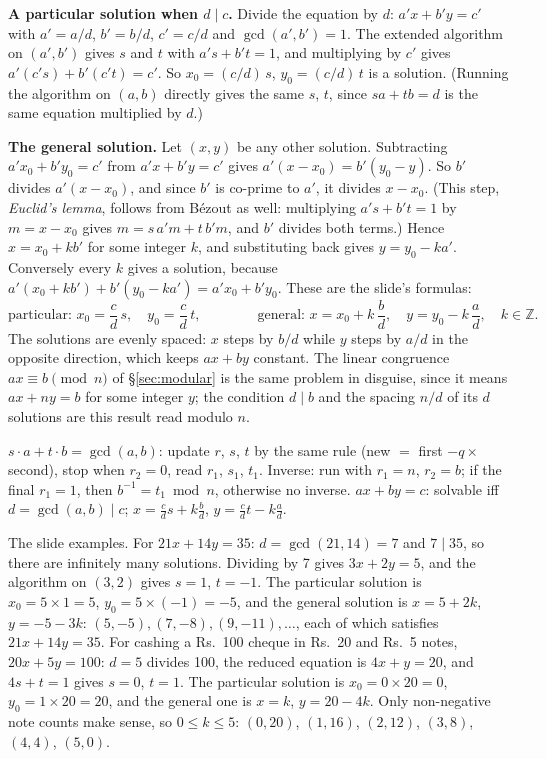 \textbf{A particular solution when $d \mid c$.} Divide the equation by $d$: $a'x + b'y = c'$ with $a' = a/d$, $b' = b/d$, $c' = c/d$ and $\gcd(a', b') = 1$. The extended algorithm on $(a', b')$ gives $s$ and $t$ with $a's + b't = 1$, and multiplying by $c'$ gives $a'(c's) + b'(c't) = c'$. So $x_0 = (c/d)\,s$, $y_0 = (c/d)\,t$ is a solution. (Running the algorithm on $(a, b)$ directly gives the same $s$, $t$, since $sa + tb = d$ is the same equation multiplied by $d$.)

\textbf{The general solution.} Let $(x, y)$ be any other solution. Subtracting $a'x_0 + b'y_0 = c'$ from $a'x + b'y = c'$ gives $a'(x - x_0) = b'(y_0 - y)$. So $b'$ divides $a'(x - x_0)$, and since $b'$ is co-prime to $a'$, it divides $x - x_0$. (This step, \emph{Euclid's lemma}, follows from Bézout as well: multiplying $a's + b't = 1$ by $m = x - x_0$ gives $m = s\,a'm + t\,b'm$, and $b'$ divides both terms.) Hence $x = x_0 + k b'$ for some integer $k$, and substituting back gives $y = y_0 - k a'$. Conversely every $k$ gives a solution, because $a'(x_0 + kb') + b'(y_0 - ka') = a'x_0 + b'y_0$. These are the slide's formulas:
\[
\text{particular: } x_0 = \frac{c}{d}\,s, \quad y_0 = \frac{c}{d}\,t, \qquad\qquad
\text{general: } x = x_0 + k\,\frac{b}{d}, \quad y = y_0 - k\,\frac{a}{d}, \quad k \in \mathbb{Z}.
\]
The solutions are evenly spaced: $x$ steps by $b/d$ while $y$ steps by $a/d$ in the opposite direction, which keeps $ax + by$ constant. The linear congruence $ax \equiv b \pmod n$ of \S\ref{sec:modular} is the same problem in disguise, since it means $ax + ny = b$ for some integer $y$; the condition $d \mid b$ and the spacing $n/d$ of its $d$ solutions are this result read modulo $n$.

\begin{mustknow}
$s \cdot a + t \cdot b = \gcd(a, b)$: update $r$, $s$, $t$ by the same rule (new $=$ first $- q \times$ second), stop when $r_2 = 0$, read $r_1$, $s_1$, $t_1$.
Inverse: run with $r_1 = n$, $r_2 = b$; if the final $r_1 = 1$, then $b^{-1} = t_1 \bmod n$, otherwise no inverse.
$ax + by = c$: solvable iff $d = \gcd(a, b) \mid c$; $x = \frac{c}{d}s + k\frac{b}{d}$, \;$y = \frac{c}{d}t - k\frac{a}{d}$.
\end{mustknow}

The slide examples. For $21x + 14y = 35$: $d = \gcd(21, 14) = 7$ and $7 \mid 35$, so there are infinitely many solutions. Dividing by 7 gives $3x + 2y = 5$, and the algorithm on $(3, 2)$ gives $s = 1$, $t = -1$. The particular solution is $x_0 = 5 \times 1 = 5$, $y_0 = 5 \times (-1) = -5$, and the general solution is $x = 5 + 2k$, $y = -5 - 3k$: $(5, -5), (7, -8), (9, -11), \dots$, each of which satisfies $21x + 14y = 35$.
For cashing a Rs.~100 cheque in Rs.~20 and Rs.~5 notes, $20x + 5y = 100$: $d = 5$ divides 100, the reduced equation is $4x + y = 20$, and $4s + t = 1$ gives $s = 0$, $t = 1$. The particular solution is $x_0 = 0 \times 20 = 0$, $y_0 = 1 \times 20 = 20$, and the general one is $x = k$, $y = 20 - 4k$. Only non-negative note counts make sense, so $0 \le k \le 5$: $(0, 20)$, $(1, 16)$, $(2, 12)$, $(3, 8)$, $(4, 4)$, $(5, 0)$.

